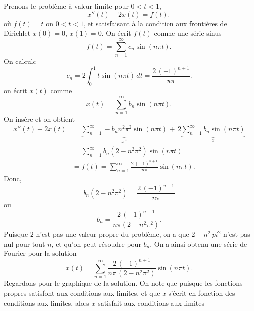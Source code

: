 \begin{example}
Prenons le problème à valeur limite pour $0 < t < 1$,
\begin{equation*}
x''(t) + 2 x(t) = f(t) ,
\end{equation*}
où $f(t) = t$ on $0 < t < 1$, et satisfaisant à la condition aux frontières de Dirichlet  $x(0) = 0$, $x(1)=0$.
On écrit $f(t)$ comme une série sinus
\begin{equation*}
f(t) = \sum_{n=1}^\infty c_n \sin (n \pi t) .
\end{equation*}
On calcule
\begin{equation*}
c_n = 2 \int_0^1 t \sin (n \pi t) \,dt = \frac{2 \, {(-1)}^{n+1}}{n \pi} .
\end{equation*}
on écrit  $x(t)$ comme
\begin{equation*}
x(t) = \sum_{n=1}^\infty b_n \sin (n \pi t) .
\end{equation*}
On insère et on obtient
\begin{equation*}
\begin{split}
x''(t) + 2 x(t) & =
\underbrace{
\sum_{n=1}^\infty - b_n n^2 \pi^2 \sin (n \pi t)
}_{x''}
\,
+
\,
2
\underbrace{
\sum_{n=1}^\infty b_n \sin (n \pi t)
}_{x}
\\
& =
\sum_{n=1}^\infty b_n (2 - n^2 \pi^2 ) \sin (n \pi t)
\\
& = f(t)
=
\sum_{n=1}^\infty  \frac{2\, {(-1)}^{n+1}}{n \pi} \sin (n \pi t) .
\end{split}
\end{equation*}
Donc,
\begin{equation*}
b_n (2 - n^2 \pi^2)
=
\frac{2\,{(-1)}^{n+1}}{n \pi}
\end{equation*}
ou
\begin{equation*}
b_n
=
\frac{2\,{(-1)}^{n+1}}{n \pi (2 - n^2 \pi^2)} .
\end{equation*}
Puisque $ 2 $ n'est pas une valeur propre du problème, on a que $ 2-n ^ 2 \ pi ^ 2 $ n'est pas nul pour tout $ n $, et qu'on peut résoudre pour $ b_n $. On a ainsi obtenu une série de Fourier pour la solution
\begin{equation*}
x(t) = 
\sum_{n=1}^\infty
\frac{2\,{(-1)}^{n+1}}{n \pi \,(2 - n^2 \pi^2)}
\sin (n \pi t) .
\end{equation*}
Regardons  pour le graphique de la solution.
On note que puisque les fonctions propres satisfont aux conditions aux limites,
et que $ x $ s'écrit en fonction des conditions aux limites, alors $ x $
satisfait aux conditions aux limites
\begin{myfig}
\capstart
{}
\caption{Graphe de la solution de $x''+2x=t$, $x(0)=0$, $x(1)=0$.%
\label{bnd-dirich-graph:fig}}
\end{myfig}
\end{example}

